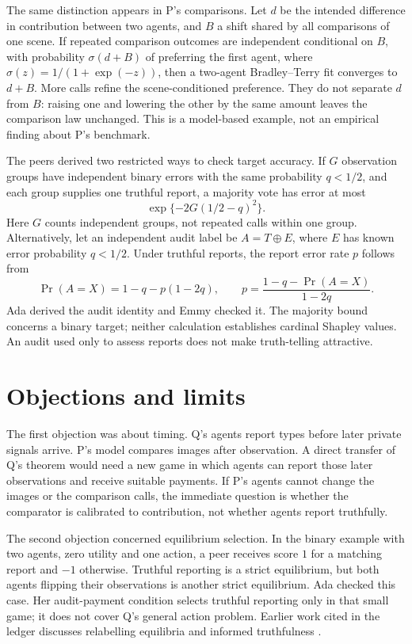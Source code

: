\documentclass{article}
\begin{document}
The same distinction appears in P's comparisons. Let \(d\) be the intended difference in
contribution between two agents, and \(B\) a shift shared by all comparisons of one scene. If
repeated comparison outcomes are independent conditional on \(B\), with probability \(\sigma(d+B)\)
of preferring the first agent, where \(\sigma(z)=1/(1+\exp(-z))\), then a two-agent Bradley--Terry
fit converges to \(d+B\). More calls refine the scene-conditioned preference. They do not separate
\(d\) from \(B\): raising one and lowering the other by the same amount leaves the comparison law
unchanged. This is a model-based example, not an empirical finding about P's benchmark.

The peers derived two restricted ways to check target accuracy. If \(G\) observation groups have
independent binary errors with the same probability \(q<1/2\), and each group supplies one truthful
report, a majority vote has error at most
\[
\exp\{-2G(1/2-q)^2\}.
\]
Here \(G\) counts independent groups, not repeated calls within one group. Alternatively, let an
independent audit label be \(A=T\oplus E\), where \(E\) has known error probability \(q<1/2\). Under
truthful reports, the report error rate \(p\) follows from
\[
\Pr(A=X)=1-q-p(1-2q),\qquad
p=\frac{1-q-\Pr(A=X)}{1-2q}.
\]
Ada derived the audit identity and Emmy checked it. The majority bound concerns a binary target;
neither calculation establishes cardinal Shapley values. An audit used only to assess reports does
not make truth-telling attractive.

\section{Objections and limits}

The first objection was about timing. Q's agents report types before later private signals arrive.
P's model compares images after observation. A direct transfer of Q's theorem would need a new game
in which agents can report those later observations and receive suitable payments. If P's agents
cannot change the images or the comparison calls, the immediate question is whether the comparator
is calibrated to contribution, not whether agents report truthfully.

The second objection concerned equilibrium selection. In the binary example with two agents, zero
utility and one action, a peer receives score \(1\) for a matching report and \(-1\) otherwise.
Truthful reporting is a strict equilibrium, but both agents flipping their observations is another
strict equilibrium. Ada checked this case. Her audit-payment condition selects truthful reporting
only in that small game; it does not cover Q's general action problem. Earlier work cited in the
ledger discusses relabelling equilibria and informed truthfulness \cite{relabel,informed}.
\end{document}

